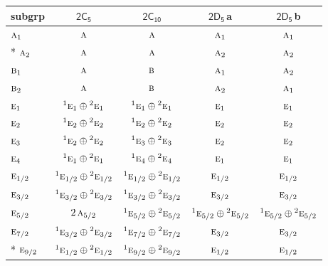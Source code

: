\documentclass[10pt,a4paper]{article}
\numberwithin{equation}{section}
\newcommand{\grp}[1]{\mathsf{#1}}
\newcommand{\irr}[1]{\text{\normalfont\scshape #1}}
\newcommand{\conjpair}[1]{{}^{#1}}
\newcommand{\clsletter}[1]{\,{\scriptsize\color{black!55}#1}}
\begin{document}
{\small\begin{longtable}{@{}lcccc@{}}\toprule
subgrp & \href{2C5.pdf}{$\grp{2C_{5}}$} & \href{2C10.pdf}{$\grp{2C_{10}}$} & \href{2D5.pdf}{$\grp{2D_{5}}$}\clsletter{a} & \href{2D5.pdf}{$\grp{2D_{5}}$}\clsletter{b}\\\midrule\endhead
\bottomrule\endfoot\endlastfoot
$\irr{a}_{1}$ & $\irr{a}$ & $\irr{a}$ & $\irr{a}_{1}$ & $\irr{a}_{1}$\\*
$\irr{a}_{2}$ & $\irr{a}$ & $\irr{a}$ & $\irr{a}_{2}$ & $\irr{a}_{2}$\\
$\irr{b}_{1}$ & $\irr{a}$ & $\irr{b}$ & $\irr{a}_{1}$ & $\irr{a}_{2}$\\
$\irr{b}_{2}$ & $\irr{a}$ & $\irr{b}$ & $\irr{a}_{2}$ & $\irr{a}_{1}$\\
$\irr{e}_{1}$ & $\conjpair{1}\irr{e}_{1}\oplus \conjpair{2}\irr{e}_{1}$ & $\conjpair{1}\irr{e}_{1}\oplus \conjpair{2}\irr{e}_{1}$ & $\irr{e}_{1}$ & $\irr{e}_{1}$\\
$\irr{e}_{2}$ & $\conjpair{1}\irr{e}_{2}\oplus \conjpair{2}\irr{e}_{2}$ & $\conjpair{1}\irr{e}_{2}\oplus \conjpair{2}\irr{e}_{2}$ & $\irr{e}_{2}$ & $\irr{e}_{2}$\\
$\irr{e}_{3}$ & $\conjpair{1}\irr{e}_{2}\oplus \conjpair{2}\irr{e}_{2}$ & $\conjpair{1}\irr{e}_{3}\oplus \conjpair{2}\irr{e}_{3}$ & $\irr{e}_{2}$ & $\irr{e}_{2}$\\
$\irr{e}_{4}$ & $\conjpair{1}\irr{e}_{1}\oplus \conjpair{2}\irr{e}_{1}$ & $\conjpair{1}\irr{e}_{4}\oplus \conjpair{2}\irr{e}_{4}$ & $\irr{e}_{1}$ & $\irr{e}_{1}$\\
$\irr{e}_{1/2}$ & $\conjpair{1}\irr{e}_{1/2}\oplus \conjpair{2}\irr{e}_{1/2}$ & $\conjpair{1}\irr{e}_{1/2}\oplus \conjpair{2}\irr{e}_{1/2}$ & $\irr{e}_{1/2}$ & $\irr{e}_{1/2}$\\
$\irr{e}_{3/2}$ & $\conjpair{1}\irr{e}_{3/2}\oplus \conjpair{2}\irr{e}_{3/2}$ & $\conjpair{1}\irr{e}_{3/2}\oplus \conjpair{2}\irr{e}_{3/2}$ & $\irr{e}_{3/2}$ & $\irr{e}_{3/2}$\\
$\irr{e}_{5/2}$ & $2\,\irr{a}_{5/2}$ & $\conjpair{1}\irr{e}_{5/2}\oplus \conjpair{2}\irr{e}_{5/2}$ & $\conjpair{1}\irr{e}_{5/2}\oplus \conjpair{2}\irr{e}_{5/2}$ & $\conjpair{1}\irr{e}_{5/2}\oplus \conjpair{2}\irr{e}_{5/2}$\\
$\irr{e}_{7/2}$ & $\conjpair{1}\irr{e}_{3/2}\oplus \conjpair{2}\irr{e}_{3/2}$ & $\conjpair{1}\irr{e}_{7/2}\oplus \conjpair{2}\irr{e}_{7/2}$ & $\irr{e}_{3/2}$ & $\irr{e}_{3/2}$\\*
$\irr{e}_{9/2}$ & $\conjpair{1}\irr{e}_{1/2}\oplus \conjpair{2}\irr{e}_{1/2}$ & $\conjpair{1}\irr{e}_{9/2}\oplus \conjpair{2}\irr{e}_{9/2}$ & $\irr{e}_{1/2}$ & $\irr{e}_{1/2}$\\
\bottomrule\end{longtable}}
\end{document}
